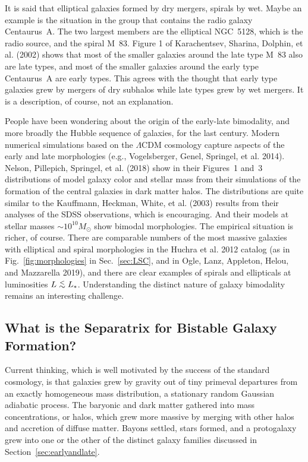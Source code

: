 \documentclass[fleqn,usenatbib]{mnras}
\def\lap{\lower.5ex\hbox{$\; \buildrel < \over \sim \;$}}
\begin{document}
It is said that elliptical galaxies formed by dry mergers, spirals by wet. Maybe an example is the situation in the group that contains the radio galaxy Centaurus~A. The two largest members are the elliptical NGC~5128, which is the radio source, and the spiral M~83.  Figure 1 of  Karachentsev, Sharina, Dolphin, et al. (2002) shows that most of the smaller galaxies around the late type M~83 also are late types, and most of the smaller galaxies around the early type Centaurus~A are early types. This agrees with the thought that early type galaxies grew by mergers of dry subhalos while late types grew by wet mergers. It is a description, of course, not an explanation.

People have been wondering about the origin of the early-late bimodality, and more broadly the Hubble sequence of galaxies, for the last century. Modern numerical simulations based on the $\Lambda$CDM cosmology capture aspects of the early and late morphologies (e.g., Vogelsberger, Genel, Springel, et al. 2014). Nelson, Pillepich, Springel, et al. (2018) show in their Figures~1 and~3 distributions of model galaxy color and stellar mass from their simulations of the formation of the central galaxies in dark matter halos. The distributions are quite similar to the Kauffmann, Heckman, White, et al. (2003) results from their analyses of the SDSS observations, which is encouraging. And their models at stellar masses $\sim 10^{10}M_\odot$ show bimodal morphologies. The empirical situation is richer, of course.  There are comparable numbers of the most massive galaxies with elliptical and spiral morphologies in the Huchra et al. 2012 catalog (as in Fig.~\ref{fig:morphologies} in Sec.~\ref{sec:LSC}, and in Ogle, Lanz, Appleton, Helou, and Mazzarella 2019), and there are clear examples of spirals and ellipticals at luminosities $L\lap L_\ast$. Understanding the distinct nature of galaxy bimodality remains an interesting challenge.

\subsection{What is the Separatrix for Bistable Galaxy Formation?}\label{separatrix} 

Current thinking, which is well motivated by the success of the standard cosmology, is that galaxies grew by gravity out of tiny primeval departures from an exactly homogeneous mass distribution, a stationary random Gaussian adiabatic process. The baryonic and dark matter gathered into mass concentrations, or halos, which grew more massive by merging with other halos and accretion of diffuse matter. Bayons settled, stars formed, and a protogalaxy grew into one or the other of the distinct galaxy families discussed in Section~\ref{sec:earlyandlate}.
\end{document}
